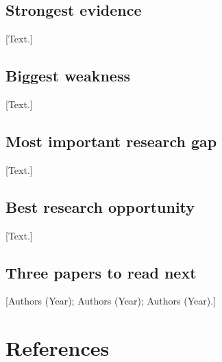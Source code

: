 \documentclass{lrreview}
\begin{document}
\subsection{Strongest evidence}
[Text.]
\subsection{Biggest weakness}
[Text.]
\subsection{Most important research gap}
[Text.]
\subsection{Best research opportunity}
[Text.]
\subsection{Three papers to read next}
[Authors (Year); Authors (Year); Authors (Year).]

\section{References}
\begin{lrbibliography}
\end{lrbibliography}
\end{document}
